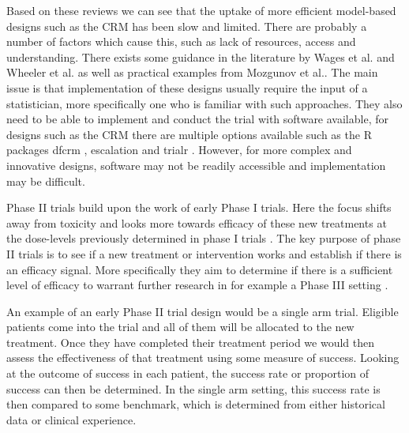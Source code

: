 Based on these reviews we can see that the uptake of more efficient model-based designs such as the CRM has been slow and limited. There are probably a number of factors which cause this, such as lack of resources, access and understanding. There exists some guidance in the literature by Wages et al. \cite{wagesDesignConsiderationsEarlyphase2018} and Wheeler et al. \cite{wheelerHowDesignDosefinding2019} as well as practical examples from Mozgunov et al.\cite{mozgunovPracticalImplementationPartial2022}. The main issue is that implementation of these designs usually require the input of a statistician, more specifically one who is familiar with such approaches. They also need to be able to implement and conduct the trial with software available, for designs such as the CRM there are multiple options available such as the R packages dfcrm \cite{cheungDfcrmDoseFindingContinual2019}, escalation \cite{brockModularApproachDose2020} and trialr \cite{brockTrialrClinicalTrial2023}. However, for more complex and innovative designs, software may not be readily accessible and implementation may be difficult.

Phase \RN{2} trials build upon the work of early Phase \RN{1} trials. Here the focus shifts away from toxicity and looks more towards efficacy of these new treatments at the dose-levels previously determined in phase \RN{1} trials \cite{berryBayesianAdaptiveMethods2010}. The key purpose of phase \RN{2} trials is to see if a new treatment or intervention works and establish if there is an efficacy signal. More specifically they aim to determine if there is a sufficient level of efficacy to warrant further research in for example a Phase \RN{3} setting \cite{juliousIntroductionStatisticsEarly2010}.

An example of an early Phase \RN{2} trial design would be a single arm trial. Eligible patients come into the trial 
and all of them will be allocated to the new treatment. Once they have completed their treatment period we would then assess the effectiveness of that treatment using some measure of success. Looking at the outcome of success in each patient, the success rate or proportion of success can then be determined. In the single arm setting, this success rate is then compared to some benchmark, which is determined from either historical data or clinical experience.


